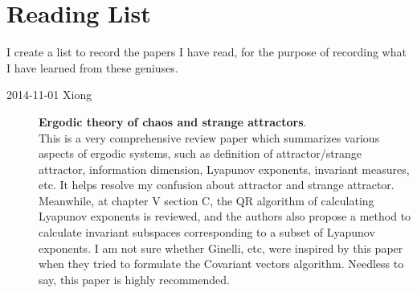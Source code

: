 \section{Reading List}
\label{sect:readlist}

I create a list to record the papers I have read, for the purpose of
recording what I have learned from these geniuses.
\begin{description}

\item[2014-11-01 Xiong]
  \textbf{Ergodic theory of chaos and strange attractors}.\\
  This is a very comprehensive review paper which summarizes various aspects
  of ergodic systems, such as definition of attractor/strange attractor,
  information dimension, Lyapunov exponents, invariant measures, etc.
  It helps resolve my confusion about attractor and strange attractor.
  Meanwhile, at chapter V section C, the QR algorithm of calculating
  Lyapunov exponents is reviewed, and the authors also propose a method
  to calculate invariant subspaces corresponding to a subset of Lyapunov
  exponents. I am not sure whether Ginelli, etc, were inspired by this
  paper when they tried to formulate the Covariant vectors algorithm.
  Needless to say, this paper is highly recommended.

\end{description}
